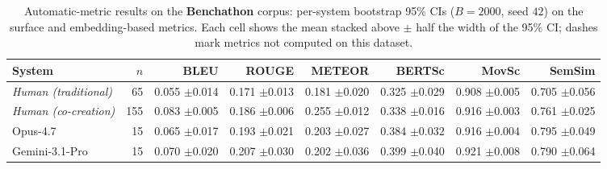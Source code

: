 \begin{table}[t]
\centering\footnotesize
\caption{Automatic-metric results on the \textbf{Benchathon} corpus: per-system bootstrap 95\% CIs ($B=2000$, seed $42$) on the surface and embedding-based metrics. Each cell shows the mean stacked above $\pm$ half the width of the 95\% CI; dashes mark metrics not computed on this dataset.}
\label{tbl-full-results-auto-benchathon}
\setlength{\tabcolsep}{4pt}
\begin{tabular*}{\textwidth}{@{\extracolsep{\fill}}lrrrrrrr@{}}
\toprule
System & $n$ & BLEU & ROUGE & METEOR & BERTSc & MovSc & SemSim \\
\midrule
\textit{Human (traditional)} & 65 & \shortstack[r]{0.055\\{\scriptsize $\pm$0.014}} & \shortstack[r]{0.171\\{\scriptsize $\pm$0.013}} & \shortstack[r]{0.181\\{\scriptsize $\pm$0.020}} & \shortstack[r]{0.325\\{\scriptsize $\pm$0.029}} & \shortstack[r]{0.908\\{\scriptsize $\pm$0.005}} & \shortstack[r]{0.705\\{\scriptsize $\pm$0.056}} \\
\textit{Human (co-creation)} & 155 & \shortstack[r]{0.083\\{\scriptsize $\pm$0.005}} & \shortstack[r]{0.186\\{\scriptsize $\pm$0.006}} & \shortstack[r]{0.255\\{\scriptsize $\pm$0.012}} & \shortstack[r]{0.338\\{\scriptsize $\pm$0.016}} & \shortstack[r]{0.916\\{\scriptsize $\pm$0.003}} & \shortstack[r]{0.761\\{\scriptsize $\pm$0.025}} \\
Opus-4.7 & 15 & \shortstack[r]{0.065\\{\scriptsize $\pm$0.017}} & \shortstack[r]{0.193\\{\scriptsize $\pm$0.021}} & \shortstack[r]{0.203\\{\scriptsize $\pm$0.027}} & \shortstack[r]{0.384\\{\scriptsize $\pm$0.032}} & \shortstack[r]{0.916\\{\scriptsize $\pm$0.004}} & \shortstack[r]{0.795\\{\scriptsize $\pm$0.049}} \\
Gemini-3.1-Pro & 15 & \shortstack[r]{0.070\\{\scriptsize $\pm$0.020}} & \shortstack[r]{0.207\\{\scriptsize $\pm$0.030}} & \shortstack[r]{0.202\\{\scriptsize $\pm$0.036}} & \shortstack[r]{0.399\\{\scriptsize $\pm$0.040}} & \shortstack[r]{0.921\\{\scriptsize $\pm$0.008}} & \shortstack[r]{0.790\\{\scriptsize $\pm$0.064}} \\

\end{tabular*}
\end{table}

